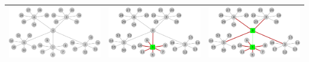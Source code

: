 \begin{center}
\begin{tabular}{ |c||c|c| }
			\hline
			\includegraphics[scale = 0.2]{img/ej3/constructiva_golosa/banana5,7_st0.png} &
			\includegraphics[scale = 0.2]{img/ej3/constructiva_golosa/banana5,7_st1.png} &
			\includegraphics[scale = 0.2]{img/ej3/constructiva_golosa/banana5,7_st2.png} \\
			\hline
		\end{tabular}
	\end{center}




